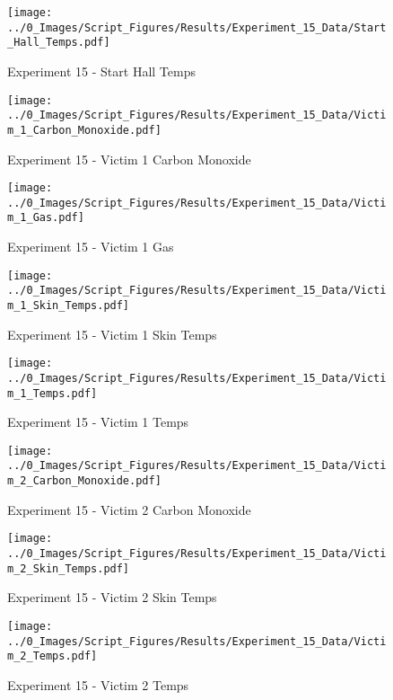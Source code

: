 	\clearpage

	\begin{figure}[H]
		\centering
		\texttt{[image: ../0\_Images/Script\_Figures/Results/Experiment\_15\_Data/Start\_Hall\_Temps.pdf]}
		\caption[]{Experiment 15 - Start Hall Temps}
	\end{figure}
 

	\begin{figure}[H]
		\centering
		\texttt{[image: ../0\_Images/Script\_Figures/Results/Experiment\_15\_Data/Victim\_1\_Carbon\_Monoxide.pdf]}
		\caption[]{Experiment 15 - Victim 1 Carbon Monoxide}
	\end{figure}
 
	\clearpage

	\begin{figure}[H]
		\centering
		\texttt{[image: ../0\_Images/Script\_Figures/Results/Experiment\_15\_Data/Victim\_1\_Gas.pdf]}
		\caption[]{Experiment 15 - Victim 1 Gas}
	\end{figure}
 

	\begin{figure}[H]
		\centering
		\texttt{[image: ../0\_Images/Script\_Figures/Results/Experiment\_15\_Data/Victim\_1\_Skin\_Temps.pdf]}
		\caption[]{Experiment 15 - Victim 1 Skin Temps}
	\end{figure}
 
	\clearpage

	\begin{figure}[H]
		\centering
		\texttt{[image: ../0\_Images/Script\_Figures/Results/Experiment\_15\_Data/Victim\_1\_Temps.pdf]}
		\caption[]{Experiment 15 - Victim 1 Temps}
	\end{figure}
 

	\begin{figure}[H]
		\centering
		\texttt{[image: ../0\_Images/Script\_Figures/Results/Experiment\_15\_Data/Victim\_2\_Carbon\_Monoxide.pdf]}
		\caption[]{Experiment 15 - Victim 2 Carbon Monoxide}
	\end{figure}
 
	\clearpage

	\begin{figure}[H]
		\centering
		\texttt{[image: ../0\_Images/Script\_Figures/Results/Experiment\_15\_Data/Victim\_2\_Skin\_Temps.pdf]}
		\caption[]{Experiment 15 - Victim 2 Skin Temps}
	\end{figure}
 

	\begin{figure}[H]
		\centering
		\texttt{[image: ../0\_Images/Script\_Figures/Results/Experiment\_15\_Data/Victim\_2\_Temps.pdf]}
		\caption[]{Experiment 15 - Victim 2 Temps}
	\end{figure}
 
